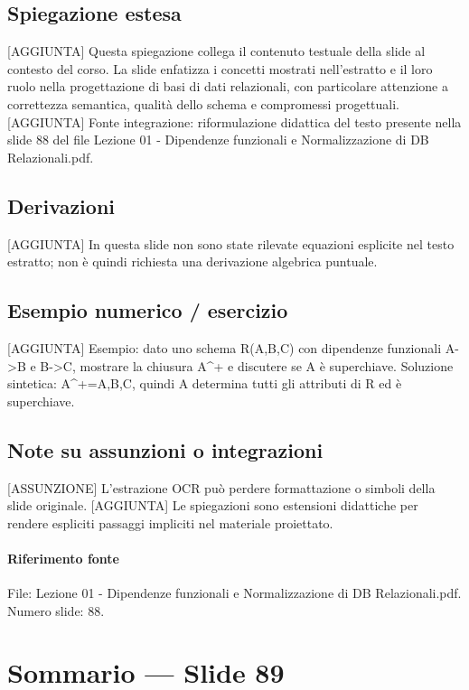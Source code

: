 \documentclass[11pt]{article}
\begin{document}
\subsection*{Spiegazione estesa}
[AGGIUNTA] Questa spiegazione collega il contenuto testuale della slide al contesto del corso. La slide enfatizza i concetti mostrati nell'estratto e il loro ruolo nella progettazione di basi di dati relazionali, con particolare attenzione a correttezza semantica, qualità dello schema e compromessi progettuali.
[AGGIUNTA] Fonte integrazione: riformulazione didattica del testo presente nella slide 88 del file Lezione 01 - Dipendenze funzionali e Normalizzazione di DB Relazionali.pdf.
\subsection*{Derivazioni}
[AGGIUNTA] In questa slide non sono state rilevate equazioni esplicite nel testo estratto; non è quindi richiesta una derivazione algebrica puntuale.
\subsection*{Esempio numerico / esercizio}
[AGGIUNTA] Esempio: dato uno schema R(A,B,C) con dipendenze funzionali A->B e B->C, mostrare la chiusura A^+ e discutere se A è superchiave. Soluzione sintetica: A^+={A,B,C}, quindi A determina tutti gli attributi di R ed è superchiave.
\subsection*{Note su assunzioni o integrazioni}
[ASSUNZIONE] L'estrazione OCR può perdere formattazione o simboli della slide originale.
[AGGIUNTA] Le spiegazioni sono estensioni didattiche per rendere espliciti passaggi impliciti nel materiale proiettato.
\paragraph{Riferimento fonte} File: Lezione 01 - Dipendenze funzionali e Normalizzazione di DB Relazionali.pdf. Numero slide: 88.
\section{Sommario --- Slide 89}
\end{document}
